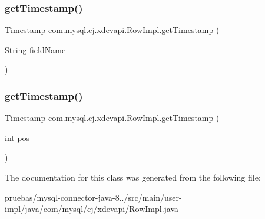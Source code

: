 \mbox{\label{classcom_1_1mysql_1_1cj_1_1xdevapi_1_1_row_impl_a07e19f59090e74951f1c52c73c1e1d63}} 
\subsubsection{\texorpdfstring{get\+Timestamp()}{getTimestamp()}\hspace{0.1cm}{\footnotesize\ttfamily [1/2]}}
{\footnotesize\ttfamily Timestamp com.\+mysql.\+cj.\+xdevapi.\+Row\+Impl.\+get\+Timestamp (\begin{DoxyParamCaption}\item[{String}]{field\+Name }\end{DoxyParamCaption})}

\mbox{\label{classcom_1_1mysql_1_1cj_1_1xdevapi_1_1_row_impl_ae938f3d1a95707b537489df90ce8d20f}} 
\subsubsection{\texorpdfstring{get\+Timestamp()}{getTimestamp()}\hspace{0.1cm}{\footnotesize\ttfamily [2/2]}}
{\footnotesize\ttfamily Timestamp com.\+mysql.\+cj.\+xdevapi.\+Row\+Impl.\+get\+Timestamp (\begin{DoxyParamCaption}\item[{int}]{pos }\end{DoxyParamCaption})}



The documentation for this class was generated from the following file\+:\begin{DoxyCompactItemize}
\item 
pruebas/mysql-\/connector-\/java-\/8../src/main/user-\/impl/java/com/mysql/cj/xdevapi/\mbox{\hyperlink{_row_impl_8java}{Row\+Impl.\+java}}\end{DoxyCompactItemize}
